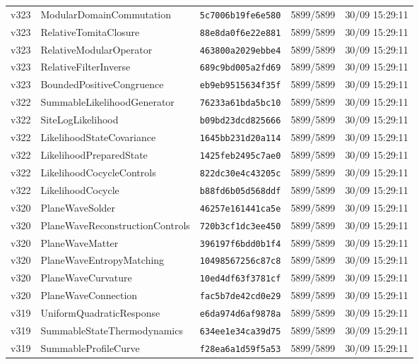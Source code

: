 \documentclass[11pt]{article}
\theoremstyle{definition}\newtheorem{deriv}{Derivation}
\begin{document}
{\begin{longtable}{@{}lllll@{}}
v323 & ModularDomainCommutation & \texttt{5c7006b19fe6e580} & 5899/5899 & 30/09 15:29:11 \\
v323 & RelativeTomitaClosure & \texttt{88e8da0f6e22e881} & 5899/5899 & 30/09 15:29:11 \\
v323 & RelativeModularOperator & \texttt{463800a2029ebbe4} & 5899/5899 & 30/09 15:29:11 \\
v323 & RelativeFilterInverse & \texttt{689c9bd005a2fd69} & 5899/5899 & 30/09 15:29:11 \\
v323 & BoundedPositiveCongruence & \texttt{eb9eb9515634f35f} & 5899/5899 & 30/09 15:29:11 \\
v322 & SummableLikelihoodGenerator & \texttt{76233a61bda5bc10} & 5899/5899 & 30/09 15:29:11 \\
v322 & SiteLogLikelihood & \texttt{b09bd23dcd825666} & 5899/5899 & 30/09 15:29:11 \\
v322 & LikelihoodStateCovariance & \texttt{1645bb231d20a114} & 5899/5899 & 30/09 15:29:11 \\
v322 & LikelihoodPreparedState & \texttt{1425feb2495c7ae0} & 5899/5899 & 30/09 15:29:11 \\
v322 & LikelihoodCocycleControls & \texttt{822dc30e4c43205c} & 5899/5899 & 30/09 15:29:11 \\
v322 & LikelihoodCocycle & \texttt{b88fd6b05d568ddf} & 5899/5899 & 30/09 15:29:11 \\
v320 & PlaneWaveSolder & \texttt{46257e161441ca5e} & 5899/5899 & 30/09 15:29:11 \\
v320 & PlaneWaveReconstructionControls & \texttt{720b3cf1dc3ee450} & 5899/5899 & 30/09 15:29:11 \\
v320 & PlaneWaveMatter & \texttt{396197f6bdd0b1f4} & 5899/5899 & 30/09 15:29:11 \\
v320 & PlaneWaveEntropyMatching & \texttt{10498567256c87c8} & 5899/5899 & 30/09 15:29:11 \\
v320 & PlaneWaveCurvature & \texttt{10ed4df63f3781cf} & 5899/5899 & 30/09 15:29:11 \\
v320 & PlaneWaveConnection & \texttt{fac5b7de42cd0e29} & 5899/5899 & 30/09 15:29:11 \\
v319 & UniformQuadraticResponse & \texttt{e6da974d6af9878a} & 5899/5899 & 30/09 15:29:11 \\
v319 & SummableStateThermodynamics & \texttt{634ee1e34ca39d75} & 5899/5899 & 30/09 15:29:11 \\
v319 & SummableProfileCurve & \texttt{f28ea6a1d59f5a53} & 5899/5899 & 30/09 15:29:11 \\

\end{longtable}}
\end{document}

